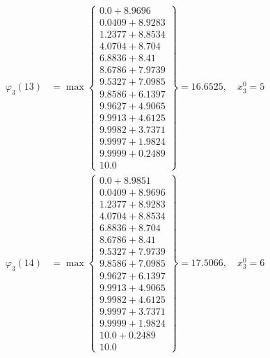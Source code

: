 \documentclass{article}
\begin{document}
\begin{align*}
  
  
  
\varphi_{3}(13) &= \max \left\{ \begin{array}{c}
0.0 + 8.9696 \\
 0.0409 + 8.9283 \\
 1.2377 + 8.8534 \\
 4.0704 + 8.704 \\
 6.8836 + 8.41 \\
 8.6786 + 7.9739 \\
 9.5327 + 7.0985 \\
 9.8586 + 6.1397 \\
 9.9627 + 4.9065 \\
 9.9913 + 4.6125 \\
 9.9982 + 3.7371 \\
 9.9997 + 1.9824 \\
 9.9999 + 0.2489 \\
 10.0
\end{array} \right\}=16.6525,\quad x_{3}^0=5\\
  
  
  
  
\varphi_{3}(14) &= \max \left\{ \begin{array}{c}
0.0 + 8.9851 \\
 0.0409 + 8.9696 \\
 1.2377 + 8.9283 \\
 4.0704 + 8.8534 \\
 6.8836 + 8.704 \\
 8.6786 + 8.41 \\
 9.5327 + 7.9739 \\
 9.8586 + 7.0985 \\
 9.9627 + 6.1397 \\
 9.9913 + 4.9065 \\
 9.9982 + 4.6125 \\
 9.9997 + 3.7371 \\
 9.9999 + 1.9824 \\
 10.0 + 0.2489 \\
 10.0
\end{array} \right\}=17.5066,\quad x_{3}^0=6\\
  
  
  

\end{align*}
\end{document}
